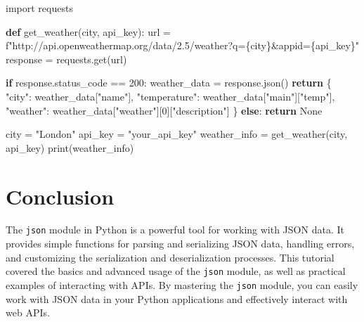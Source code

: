 \documentclass[
  letterpaper,
  DIV=11,
  numbers=noendperiod]{scrreprt}
\newenvironment{Shaded}{\begin{snugshade}}{\end{snugshade}}
\newcommand{\BuiltInTok}[1]{\textcolor[rgb]{0.00,0.23,0.31}{#1}}
\newcommand{\ControlFlowTok}[1]{\textcolor[rgb]{0.00,0.23,0.31}{\textbf{#1}}}
\newcommand{\DecValTok}[1]{\textcolor[rgb]{0.68,0.00,0.00}{#1}}
\newcommand{\ImportTok}[1]{\textcolor[rgb]{0.00,0.46,0.62}{#1}}
\newcommand{\KeywordTok}[1]{\textcolor[rgb]{0.00,0.23,0.31}{\textbf{#1}}}
\newcommand{\NormalTok}[1]{\textcolor[rgb]{0.00,0.23,0.31}{#1}}
\newcommand{\OperatorTok}[1]{\textcolor[rgb]{0.37,0.37,0.37}{#1}}
\newcommand{\SpecialCharTok}[1]{\textcolor[rgb]{0.37,0.37,0.37}{#1}}
\newcommand{\SpecialStringTok}[1]{\textcolor[rgb]{0.13,0.47,0.30}{#1}}
\newcommand{\StringTok}[1]{\textcolor[rgb]{0.13,0.47,0.30}{#1}}
\newcommand{\VariableTok}[1]{\textcolor[rgb]{0.07,0.07,0.07}{#1}}
\begin{document}
\begin{Shaded}
\begin{Highlighting}[]
\ImportTok{import}\NormalTok{ requests}

\KeywordTok{def}\NormalTok{ get\_weather(city, api\_key):}
\NormalTok{    url }\OperatorTok{=} \SpecialStringTok{f"http://api.openweathermap.org/data/2.5/weather?q=}\SpecialCharTok{\{}\NormalTok{city}\SpecialCharTok{\}}\SpecialStringTok{\&appid=}\SpecialCharTok{\{}\NormalTok{api\_key}\SpecialCharTok{\}}\SpecialStringTok{"}
\NormalTok{    response }\OperatorTok{=}\NormalTok{ requests.get(url)}
    
    \ControlFlowTok{if}\NormalTok{ response.status\_code }\OperatorTok{==} \DecValTok{200}\NormalTok{:}
\NormalTok{        weather\_data }\OperatorTok{=}\NormalTok{ response.json()}
        \ControlFlowTok{return}\NormalTok{ \{}
            \StringTok{"city"}\NormalTok{: weather\_data[}\StringTok{"name"}\NormalTok{],}
            \StringTok{"temperature"}\NormalTok{: weather\_data[}\StringTok{"main"}\NormalTok{][}\StringTok{"temp"}\NormalTok{],}
            \StringTok{"weather"}\NormalTok{: weather\_data[}\StringTok{"weather"}\NormalTok{][}\DecValTok{0}\NormalTok{][}\StringTok{"description"}\NormalTok{]}
\NormalTok{        \}}
    \ControlFlowTok{else}\NormalTok{:}
        \ControlFlowTok{return} \VariableTok{None}

\NormalTok{city }\OperatorTok{=} \StringTok{"London"}
\NormalTok{api\_key }\OperatorTok{=} \StringTok{"your\_api\_key"}
\NormalTok{weather\_info }\OperatorTok{=}\NormalTok{ get\_weather(city, api\_key)}
\BuiltInTok{print}\NormalTok{(weather\_info)}
\end{Highlighting}
\end{Shaded}

\section{Conclusion}\label{conclusion-26}

The \texttt{json} module in Python is a powerful tool for working with
JSON data. It provides simple functions for parsing and serializing JSON
data, handling errors, and customizing the serialization and
deserialization processes. This tutorial covered the basics and advanced
usage of the \texttt{json} module, as well as practical examples of
interacting with APIs. By mastering the \texttt{json} module, you can
easily work with JSON data in your Python applications and effectively
interact with web APIs.
\end{document}
